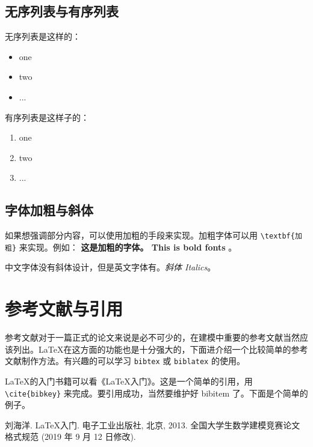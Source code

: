\documentclass[withoutpreface,bwprint]{cumcmthesis} %
\begin{document}
\subsection{无序列表与有序列表}

无序列表是这样的：
\begin{itemize}
    \item one
    \item two
    \item ...
\end{itemize}

有序列表是这样子的：
\begin{enumerate}
    \item one
    \item two
    \item ...
\end{enumerate}

\subsection{字体加粗与斜体}

如果想强调部分内容，可以使用加粗的手段来实现。加粗字体可以用 \verb|\textbf{加粗}| 来实现。例如： \textbf{这是加粗的字体。 This is bold fonts} 。

中文字体没有斜体设计，但是英文字体有。\textit{斜体 Italics}。

\section{参考文献与引用}

参考文献对于一篇正式的论文来说是必不可少的，在建模中重要的参考文献当然应该列出。\LaTeX{}在这方面的功能也是十分强大的，下面进介绍一个比较简单的参考文献制作方法。有兴趣的可以学习 \verb|bibtex| 或 \verb|biblatex| 的使用。

\LaTeX{}的入门书籍可以看《\LaTeX{}入门》\cite{liuhaiyang2013latex}。这是一个简单的引用，用 \verb|\cite{bibkey}| 来完成。要引用成功，当然要维护好 bibitem 了。下面是个简单的例子。

\newpage

\begin{thebibliography}{9}%
    刘海洋.
    \newblock \LaTeX {}入门\allowbreak[J].
    \newblock 电子工业出版社, 北京, 2013.
    全国大学生数学建模竞赛论文格式规范 (2019 年 9 月 12 日修改).
\end{thebibliography}

\newpage
\end{document}
